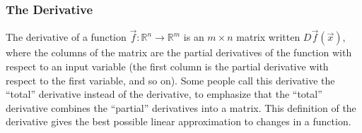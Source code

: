 \documentclass[10pt]{article}
\begin{document}
\subsubsection{The Derivative}
The derivative of a function $\vec f:\mathbb{R}^n\to\mathbb{R}^m$ is an $m\times n$ matrix written $D\vec f(\vec x)$, where the columns of the matrix are the partial derivatives of the function with respect to an input variable (the first column is the partial derivative with respect to the first variable, and so on). Some people call this derivative the ``total'' derivative instead of the derivative, to emphasize that the ``total'' derivative combines the ``partial'' derivatives into a matrix. This definition of the derivative gives the best possible linear approximation to changes in a function.
\end{document}
